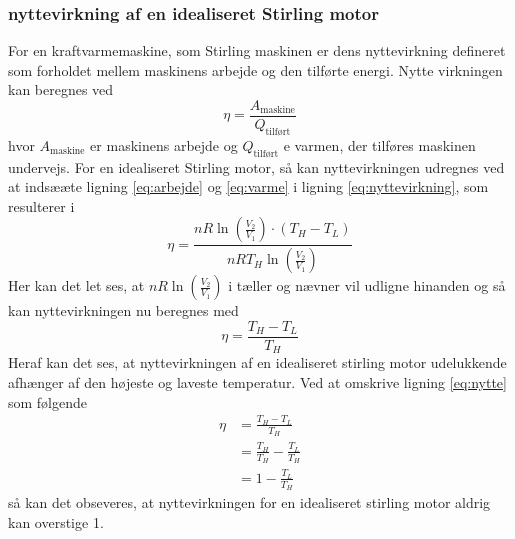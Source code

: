 \documentclass[SRC.tex]{subfiles}
\begin{document}
	\subsubsection{nyttevirkning af en idealiseret Stirling motor}
	For en kraftvarmemaskine, som Stirling maskinen er dens nyttevirkning defineret som forholdet mellem maskinens arbejde og den tilførte energi. Nytte virkningen kan beregnes ved 
	\begin{equation}
		\eta = \frac{A_{\text{maskine}}}{Q_{\text{tilført}}}
		\label{eq:nyttevirkning}
	\end{equation}
	hvor \(A_{\text{maskine}}\) er maskinens arbejde og \(Q_{\text{tilført}}\) e varmen, der tilføres maskinen undervejs. For en idealiseret Stirling motor, så kan nyttevirkningen udregnes ved at indsææte ligning \eqref{eq:arbejde} og \eqref{eq:varme} i ligning \eqref{eq:nyttevirkning}, som resulterer i
	\begin{equation}
		\eta = \frac{nR\ln\left(\frac{V_2}{V_1}\right)\cdot (T_H - T_L)}{nRT_H\ln\left(\frac{V_2}{V_1}\right)} 
	\end{equation}
	Her kan det let ses, at \(nR\ln\left(\frac{V_2}{V_1}\right)\) i tæller og nævner vil udligne hinanden og så kan nyttevirkningen nu beregnes med
	\begin{equation}
		\eta = \frac{T_H-T_L}{T_H}
		\label{eq:nytte}
	\end{equation}
	Heraf kan det ses, at nyttevirkningen af en idealiseret stirling motor udelukkende afhænger af den højeste og laveste temperatur. Ved at omskrive ligning \eqref{eq:nytte} som følgende
	\begin{subequations}
		\begin{align}
			\eta &= \frac{T_H-T_L}{T_H} \\
			 	 &= \frac{T_H}{T_H}-\frac{T_L}{T_H} \\
			 	 &= 1 -\frac{T_L}{T_H}
		\end{align}
	\end{subequations}
	så kan det obseveres, at nyttevirkningen for en idealiseret stirling motor aldrig kan overstige 1. 
\end{document}
